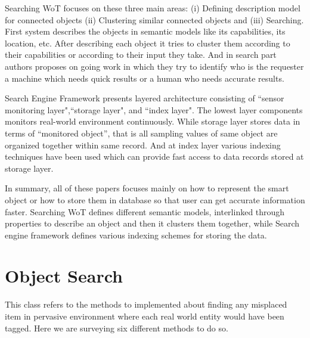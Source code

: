 \documentclass [a4paper,12pt]{book}
\begin{document}
Searching WoT\cite{22} focuses on these three main areas: (i) Defining description model for connected objects (ii) Clustering similar connected objects and (iii) Searching. First system describes the objects in semantic models like its capabilities, its location, etc. After describing each object it tries to cluster them according to their capabilities or according to their input they take. And in search part authors proposes on going work in which they try to identify who is the requester a machine which needs quick results or a human who needs accurate results.

Search Engine Framework\cite{23} presents layered architecture consisting of ``sensor monitoring layer",``storage layer", and ``index layer". The lowest layer components monitors real-world environment continuously. While storage layer stores data in terms of “monitored object”, that is all sampling values of same object are organized together within same record. And at index layer various indexing techniques have been used which can provide fast access to data records stored at storage layer.

In summary, all of these papers focuses mainly on how to represent the smart object or how to store them in database so that user can get accurate information faster. Searching WoT defines different semantic models, interlinked through properties to describe an object and then it clusters them together, while Search engine framework defines various indexing schemes for storing the data.

\section{Object Search}
This class refers to the methods to implemented about finding any misplaced item in pervasive environment where each real world entity would have been tagged. Here we are surveying six different methods to do so.
\end{document}
